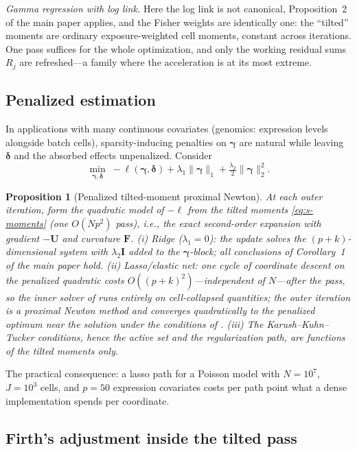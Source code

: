 \documentclass[11pt]{article}
\newtheorem{proposition}{Proposition}
\newcommand{\bgamma}{\bm{\gamma}}
\newcommand{\bdelta}{\bm{\delta}}
\newcommand{\bF}{\mathbf{F}}
\newcommand{\bU}{\mathbf{U}}
\newcommand{\bI}{\mathbf{I}}
\begin{document}
\emph{Gamma regression with log link.}  Here the log link is not
canonical, Proposition~2 of the main paper applies, and the Fisher
weights are identically one: the ``tilted'' moments are ordinary
exposure-weighted cell moments, constant across iterations.  One pass
suffices for the whole optimization, and only the working residual sums
$R_j$ are refreshed---a family where the acceleration is at its most
extreme.

\subsection{Penalized estimation}\label{sec:penalized}

In applications with many continuous covariates (genomics: expression
levels alongside batch cells), sparsity-inducing penalties on $\bgamma$
are natural while leaving $\bdelta$ and the absorbed effects
unpenalized.  Consider
\[
\min_{\bgamma, \bdelta}\;
 -\ell(\bgamma, \bdelta) + \lambda_1 \|\bgamma\|_1
 + \tfrac{\lambda_2}{2} \|\bgamma\|_2^2 .
\]

\begin{proposition}[Penalized tilted-moment proximal Newton]
\label{prop:penalized}
At each outer iteration, form the quadratic model of $-\ell$ from the
tilted moments \eqref{eq:s-moments} (one $O(Np^2)$ pass), i.e., the exact
second-order expansion with gradient $-\bU$ and curvature $\bF$.
(i) Ridge ($\lambda_1 = 0$): the update solves the $(p+k)$-dimensional
system with $\lambda_2 \bI$ added to the $\bgamma$-block; all conclusions
of Corollary~1 of the main paper hold.
(ii) Lasso/elastic net: one cycle of coordinate descent on the penalized
quadratic costs $O((p+k)^2)$---independent of $N$---after the pass, so
the inner solver of \citet{friedman2010} runs entirely on cell-collapsed
quantities; the outer iteration is a proximal Newton method and converges
quadratically to the penalized optimum near the solution under the
conditions of \citet{leesun2014}.
(iii) The Karush--Kuhn--Tucker conditions, hence the active set and the
regularization path, are functions of the tilted moments only.
\end{proposition}

The practical consequence: a lasso path for a Poisson model with
$N = 10^7$, $J = 10^3$ cells, and $p = 50$ expression covariates costs
per path point what a dense implementation spends per coordinate.

\subsection{Firth's adjustment inside the tilted pass}\label{sec:firth}
\end{document}
